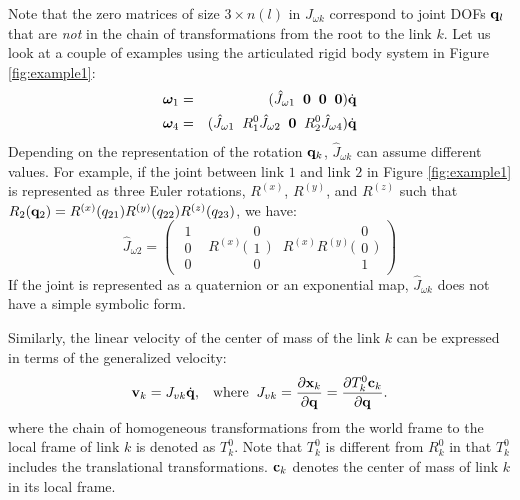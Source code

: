 Note that the zero matrices  of size $3\times n(l)$ in $J_{\omega k}$ correspond to
joint DOFs $\mathbf{q}_l$ that are \emph{not} in the chain of transformations from the root to the
link $k$. 
Let us look at a couple of examples using the articulated
rigid body system in Figure \ref{fig:example1}:
\begin{eqnarray}
\bm{\omega}_1 &=& (\hat{J}_{\omega 1} \;\; \mathbf{0}
\;\;\mathbf{0}\;\;\mathbf{0}) \dot{\mathbf{q}}  \nonumber \\
\bm{\omega}_4 &=& (\hat{J}_{\omega 1} \;\; R^0_1\hat{J}_{\omega 2} \;\;
\mathbf{0} \;\;
R^0_2 \hat{J}_{\omega 4}) \dot{\mathbf{q}} \nonumber
\end{eqnarray}
Depending on the representation of the rotation $\mathbf{q}_k$,
$\hat{J}_{\omega k}$ can assume different values. For example, if the joint
between link $1$ and link $2$ in Figure \ref{fig:example1} is
represented as three Euler rotations, $R^{(x)}$, $R^{(y)}$, and
$R^{(z)}$ such that $R_2(\mathbf{q}_2)= R^{(x)}(q_{21}) R^{(y)}(q_{22}) R^{(z)}(q_{23})$, we have:
\begin{equation}
\hat{J}_{\omega 2} = \left (
\begin{array}{ccc}
\begin{array}{c}
1\\
0\\
0
\end{array}
&
R^{(x)} \Bigg (
\begin{array}{c}
0\\
1\\
0
\end{array} 
\Bigg )
&
R^{(x)} R^{(y)}\Bigg (
\begin{array}{c}
0\\
0\\
1
\end{array} 
\Bigg )
\end{array}
\right )
\end{equation}
If the joint is represented as a quaternion or an
exponential map, $\hat{J}_{\omega k}$ does not have a simple symbolic form.


Similarly, the linear velocity of the center of mass of the link $k$
can be expressed in terms of the generalized velocity: 
\begin{equation}
\label{eq:linear_velocity_link}
\mathbf{v}_k = J_{vk} \dot{\mathbf{q}}, \;\;\;\mathrm{where}\;\; J_{vk} = \frac{\partial \mathbf{x}_k}{\partial \mathbf{q}}=  \frac{\partial T^0_k
  \mathbf{c}_k}{\partial \mathbf{q}}.
\end{equation}
where the chain of homogeneous transformations from the world frame to the local
frame of link $k$ is denoted as $T^0_k$. Note that $T^0_k$ is
different from $R^0_k$ in that $T^0_k$ includes the translational
transformations. $\mathbf{c}_k$ denotes the center of mass of link $k$ in
its local frame.

